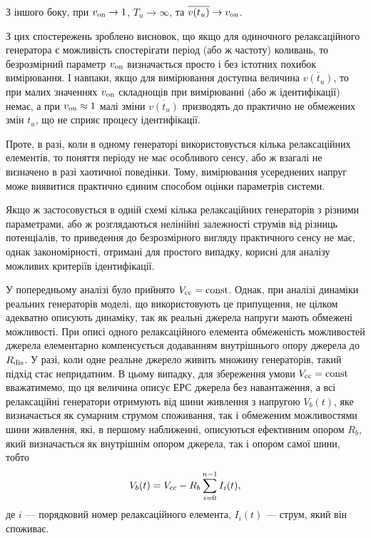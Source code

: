 З іншого боку, при
$ v _\mathrm{on} \to 1 $,
$ T_u \to \infty $,
та
$ \overline{v(t_u)} \to v_\mathrm{on}$.

З цих спостережень зроблено висновок, що якщо для одиночного
релаксаційного генератора є можливість спостерігати період
(або ж частоту) коливань, то безрозмірний параметр
$ v _\mathrm{on} $ визначається просто і без істотних похибок
вимірювання. І навпаки, якщо для вимірювання доступна величина
$ \overline{v (t_u)} $, то при малих значеннях
$ v _\mathrm{on} $ складнощів при вимірюванні (або ж ідентифікації) немає,
а при
$ v _\mathrm{on} \approx 1 $ малі зміни
$ \overline{v (t_u)} $ призводять до практично не обмежених змін
$ t_u $, що не сприяє процесу ідентифікації.

Проте, в разі, коли в одному генераторі використовується
кілька релаксаційних елементів, то поняття періоду не має
особливого сенсу, або ж взагалі не визначено в разі хаотичної
поведінки. Тому, вимірювання усереднених напруг може виявитися
практично єдиним способом оцінки параметрів системи.


Якщо ж застосовується в одній схемі кілька релаксаційних
генераторів з різними параметрами, або ж розглядаються
нелінійні залежності струмів від різниць потенціалів, то
приведення до безрозмірного вигляду практичного сенсу не має,
однак закономірності, отримані для простого випадку, корисні
для аналізу можливих критеріїв ідентифікації.


У попередньому аналізі було прийнято
$ V_\mathrm{cc} = \mathrm{const} $. Однак, при аналізі динаміки реальних
генераторів моделі, що використовують це припущення, не цілком
адекватно описують динаміку, так як реальні джерела напруги
мають обмежені можливості. При описі одного релаксаційного
елемента обмеженість можливостей джерела елементарно
компенсується додаванням внутрішнього опору джерела до
$ R _\mathrm{dis} $. У разі, коли одне реальне джерело живить множину
генераторів, такий підхід стає непридатним. В цьому випадку,
для збереження умови
$ V _\mathrm{cc} = \mathrm{const} $ вважатимемо, що ця величина описує ЕРС джерела
без навантаження, а всі релаксаційні генератори отримують від
шини живлення з напругою
$ V_b (t) $, яке визначається як сумарним струмом споживання,
так і обмеженим можливостями шини живлення, які, в першому
наближенні, описуються ефективним опором
$ R_b $, який визначається як внутрішнім опором джерела, так і
опором самої шини, тобто
%
\begin{equation}
  V_b(t) = V_\mathrm{cc} - R_b \sum\limits_{i=0}^{n-1} I_i(t),
  \label{atu:eq:V_b_relax}
\end{equation}
%
де $i$ ---
порядковий номер релаксаційного елемента,
$ I_i (t) $ --- струм, який він споживає.


